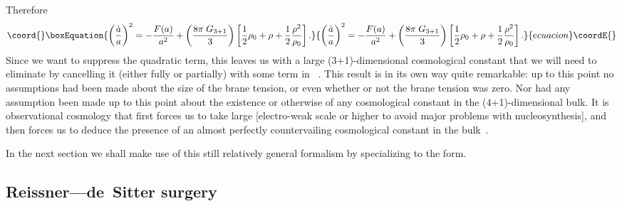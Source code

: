\documentclass[a4paper,12pt]{article}
\begin{document}
Therefore
%
\begin{equation}\coord{}\boxEquation{
\label{E:formal}
\left({\dot a \over a}\right)^2 = 
- {F(a)\over a^2} + 
\left({ 8\pi \; G_{3+1}\over3}\right) 
\left[\half \rho_0 + \rho + \half {\rho^2\over\rho_0} \right]. 
}{
\left({\dot a \over a}\right)^2 = 
- {F(a)\over a^2} + 
\left({ 8\pi \; G_{3+1}\over3}\right) 
\left[\half \rho_0 + \rho + \half {\rho^2\over\rho_0} \right]. 
}{ecuacion}\coordE{}\end{equation}
%
Since we want \myHighlight{$\rho_0\gg\rho$}\coordHE{} to suppress the quadratic term, this
leaves us with a large (3+1)-dimensional cosmological constant that we
will need to eliminate by cancelling it (either fully or partially)
with some term in \coordHE{}~\cite{RS-cosmology}.  This result is in its
own way quite remarkable: up to this point no assumptions had been
made about the size of the brane tension, or even whether or not the
brane tension was zero. Nor had any assumption been made up to this
point about the existence or otherwise of any cosmological constant
in the (4+1)-dimensional bulk. It is observational cosmology that
first forces us to take \coordHE{} large [electro-weak scale or higher
to avoid major problems with nucleosynthesis], and then forces us to
deduce the presence of an almost perfectly countervailing cosmological
constant in the bulk~\cite{RS-cosmology}.

In the next section we shall make use of this still relatively general
formalism by specializing \coordHE{} to the {\RNdS} form.


\subsection{Reissner--\Nordstrom--de~Sitter surgery}
\label{SS:RNdS}
\end{document}
